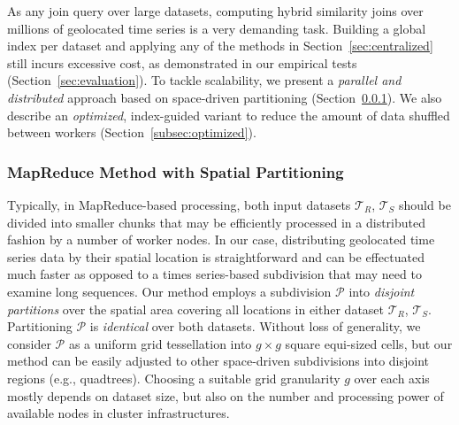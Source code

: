 As any join query over large datasets, computing hybrid similarity joins over millions of geolocated time series is a very demanding task. Building a global index per dataset and applying any of the methods in Section~\ref{sec:centralized} still incurs excessive cost, as demonstrated in our empirical tests (Section~\ref{sec:evaluation}). To tackle scalability, we present a {\em parallel and distributed} approach based on space-driven partitioning (Section~\ref{subsec:partitioned}). We also describe an {\em optimized}, index-guided variant to reduce the amount of data shuffled between workers (Section~\ref{subsec:optimized}). 




\subsubsection{\hspace{-2.8mm}MapReduce Method with Spatial Partitioning}
\label{subsec:partitioned}

Typically, in MapReduce-based processing, both input datasets $\mathcal{T}_{R}$, $\mathcal{T}_{S}$ should be divided into smaller chunks that may be efficiently processed in a distributed fashion by a number of worker nodes. In our case, distributing geolocated time series data by their spatial location is straightforward and can be effectuated much faster as opposed to a times series-based subdivision that may need to examine long sequences. Our method employs a subdivision $\mathcal{P}$ into {\em disjoint partitions} over the spatial area covering all locations in either dataset $\mathcal{T}_{R}$, $\mathcal{T}_{S}$. Partitioning $\mathcal{P}$ is {\em identical} over both datasets. Without loss of generality, we consider $\mathcal{P}$ as a uniform grid tessellation into $g \times g$ square equi-sized cells, but our method can be easily adjusted to other space-driven subdivisions into disjoint regions (e.g., quadtrees). Choosing a suitable grid granularity $g$ over each axis mostly depends on dataset size, but also on the number and processing power of available nodes in cluster infrastructures.

